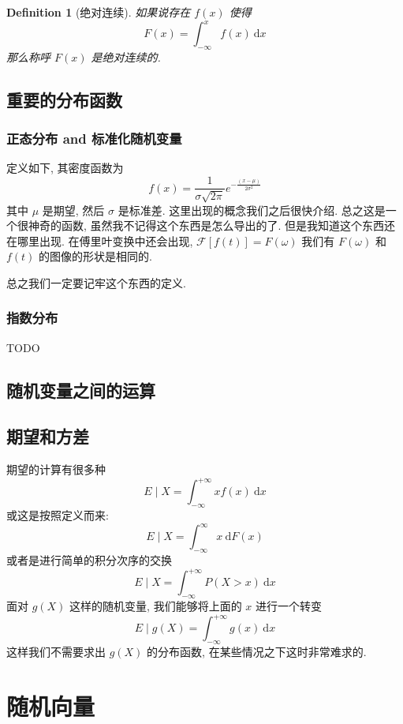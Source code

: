 \documentclass[a4paper, 10pt]{ctexart} %
\newtheorem{definition}{Definition}
\begin{document}
\begin{definition}[绝对连续]
    如果说存在 $f \left(x\right)$ 使得 
    \[
    F \left(x\right) = \int ^{x} _{-\infty} f\left(x\right) \ \mathrm{d} x
    \]
    那么称呼 $F\left(x\right) $  是绝对连续的.
\end{definition}


\subsection{重要的分布函数}
\subsubsection{正态分布 and 标准化随机变量}
定义如下, 其密度函数为
\begin{equation}
    f\left(x\right)  = \frac{1}{\sigma\sqrt{2\pi}} e^{- \frac{ \left(x  -  \mu  \right)}{2 \sigma^{2}}}
\end{equation}
其中 $\mu$ 是期望, 然后 $\sigma$ 是标准差. 这里出现的概念我们之后很快介绍. 
总之这是一个很神奇的函数, 虽然我不记得这个东西是怎么导出的了. 但是我知道这个东西还在哪里出现. 在傅里叶变换中还会出现, $\mathscr F\left[ f\left(t\right) \right] = F\left(\omega\right)$ 
我们有 $F\left(\omega\right) $ 和 $f\left(t\right)$ 的图像的形状是相同的.

总之我们一定要记牢这个东西的定义. 
\subsubsection{指数分布}
TODO
\subsection{随机变量之间的运算}
\subsection{期望和方差}
期望的计算有很多种
\[
E\mid X =\int ^{+\infty}_{-\infty} x f\left(x\right) \ \mathrm{d} x
\]
或这是按照定义而来:
\[
E\mid X = \int ^{\infty}_{-\infty} x \ \mathrm{d} F(x)
\]
或者是进行简单的积分次序的交换
\[
E \mid X = \int ^{+\infty} _{-\infty} P\left(X > x\right) \ \mathrm{d} x
\]
面对 $g \left(X\right)$ 这样的随机变量, 我们能够将上面的 $x$ 进行一个转变 
\[
E \mid g\left(X\right) = \int ^{+\infty}_{-\infty} g\left(x\right) \ \mathrm{d}x
\]
这样我们不需要求出 $g\left(X\right)$ 的分布函数, 在某些情况之下这时非常难求的.
\section{随机向量}
\end{document}
